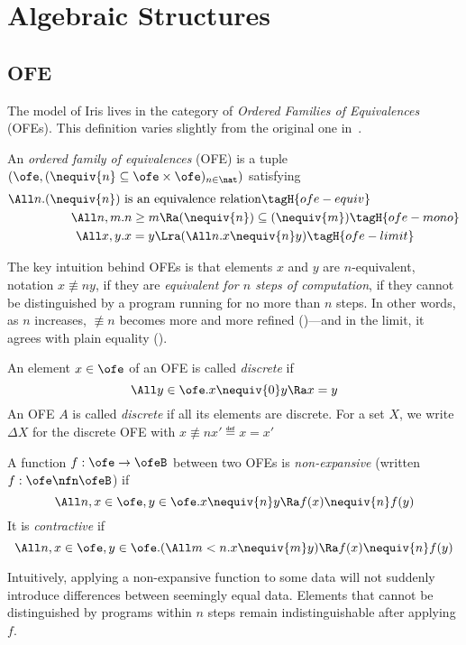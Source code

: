 \section{Algebraic Structures}

\subsection{OFE}

The model of Iris lives in the category of \emph{Ordered Families of Equivalences} (OFEs).
This definition varies slightly from the original one in~\cite{catlogic}.

\begin{defn}
  An \emph{ordered family of equivalences} (OFE) is a tuple $(\ofe, ({\nequiv{n}} \subseteq \ofe \times \ofe)_{n \in \nat})$ satisfying
  \begin{align*}
    \All n. (\nequiv{n}) ~& \text{is an equivalence relation} \tagH{ofe-equiv} \\
    \All n, m.& n \geq m \Ra (\nequiv{n}) \subseteq (\nequiv{m}) \tagH{ofe-mono} \\
    \All x, y.& x = y \Lra (\All n. x \nequiv{n} y) \tagH{ofe-limit}
  \end{align*}
\end{defn}

The key intuition behind OFEs is that elements $x$ and $y$ are $n$-equivalent, notation $x \nequiv{n} y$, if they are \emph{equivalent for $n$ steps of computation}, \ie if they cannot be distinguished by a program running for no more than $n$ steps.
In other words, as $n$ increases, $\nequiv{n}$ becomes more and more refined ()---and in the limit, it agrees with plain equality ().

\begin{defn}
  An element $x \in \ofe$ of an OFE is called \emph{discrete} if
  \[ \All y \in \ofe. x \nequiv{0} y \Ra x = y\]
  An OFE $A$ is called \emph{discrete} if all its elements are discrete.
  For a set $X$, we write $\Delta X$ for the discrete OFE with $x \nequiv{n} x' \eqdef x = x'$
\end{defn}

\begin{defn}
  A function $f : \ofe \to \ofeB$ between two OFEs is \emph{non-expansive} (written $f : \ofe \nfn \ofeB$) if
  \[\All n, x \in \ofe, y \in \ofe. x \nequiv{n} y \Ra f(x) \nequiv{n} f(y) \]
  It is \emph{contractive} if
  \[ \All n, x \in \ofe, y \in \ofe. (\All m < n. x \nequiv{m} y) \Ra f(x) \nequiv{n} f(y) \]
\end{defn}
Intuitively, applying a non-expansive function to some data will not suddenly introduce differences between seemingly equal data.
Elements that cannot be distinguished by programs within $n$ steps remain indistinguishable after applying $f$.

